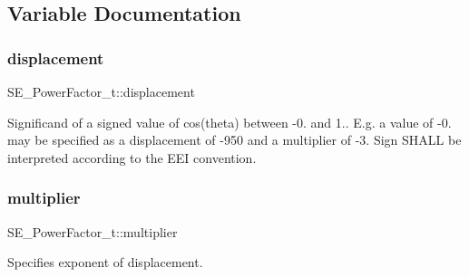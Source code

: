 \subsection{Variable Documentation}
\mbox{\label{group__PowerFactor_gac0b338823886a77ad3c03fab42c9ac5a}} 
\subsubsection{\texorpdfstring{displacement}{displacement}}
{\footnotesize\ttfamily S\+E\+\_\+\+Power\+Factor\+\_\+t\+::displacement}

Significand of a signed value of cos(theta) between -\/0. and 1.. E.\+g. a value of -\/0. may be specified as a displacement of -\/950 and a multiplier of -\/3. Sign S\+H\+A\+LL be interpreted according to the E\+EI convention. \mbox{\label{group__PowerFactor_ga7e8d88767803b7c7ed6f1c6f7eb5e08a}} 
\subsubsection{\texorpdfstring{multiplier}{multiplier}}
{\footnotesize\ttfamily S\+E\+\_\+\+Power\+Factor\+\_\+t\+::multiplier}

Specifies exponent of \textquotesingle{}displacement\textquotesingle{}. 